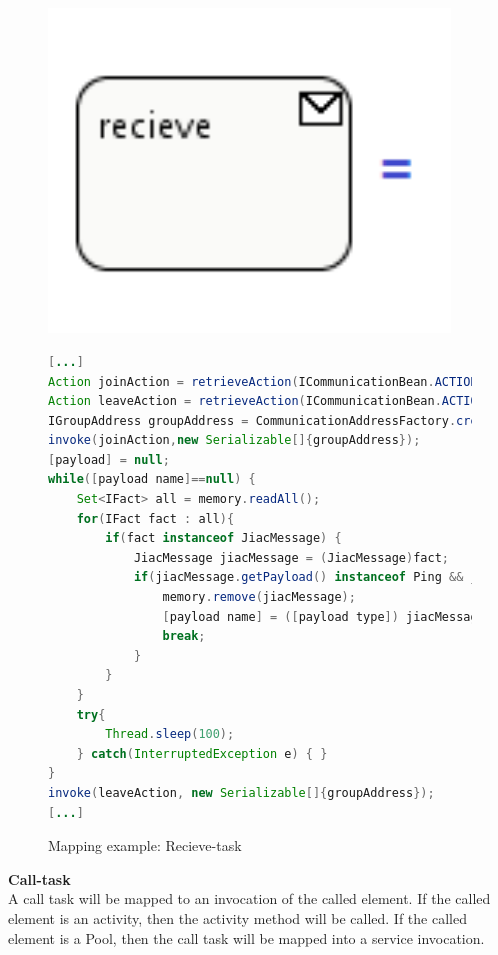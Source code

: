 \begin{figure}[h]
\begin{minipage}[c]{0.3\textwidth}
\includegraphics[width=0.95\textwidth]{images/mapping/recieveTask.png}
\end{minipage}
\begin{minipage}[c]{0.7\textwidth}
\begin{lstlisting}[language=Java]
[...]
Action joinAction = retrieveAction(ICommunicationBean.ACTION_JOIN_GROUP);
Action leaveAction = retrieveAction(ICommunicationBean.ACTION_LEAVE_GROUP);
IGroupAddress groupAddress = CommunicationAddressFactory.createGroupAddress([address]);
invoke(joinAction,new Serializable[]{groupAddress});
[payload] = null;
while([payload name]==null) {
	Set<IFact> all = memory.readAll();
	for(IFact fact : all){
		if(fact instanceof JiacMessage) {
			JiacMessage jiacMessage = (JiacMessage)fact;
			if(jiacMessage.getPayload() instanceof Ping && jiacMessage.getHeader(IJiacMessage.Header.SEND_TO).equals(groupAddress)) {
				memory.remove(jiacMessage);
				[payload name] = ([payload type]) jiacMessage.getPayload();
				break;
			}
		}
	}
	try{
		Thread.sleep(100);
	} catch(InterruptedException e) { }
}
invoke(leaveAction, new Serializable[]{groupAddress});
[...]
\end{lstlisting}
\end{minipage}
\caption{Mapping example: Recieve-task}%
\label{fig:recieve_task}%
\end{figure}

\textbf{Call-task}\\
A call task will be mapped to an invocation of the called element. If the called element is an activity, then the activity method will be called. 
If the called element is a Pool, then the call task will be mapped into a service invocation. 

